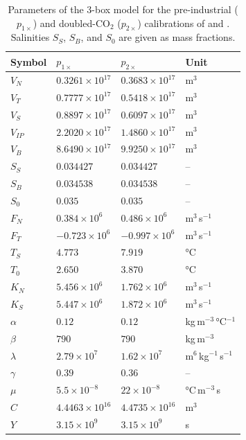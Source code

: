 \documentclass[12pt, a4paper]{article}
\newcommand{\CO}{CO\ensuremath{_2}}
\begin{document}
\begin{table}[t]
  \centering
  \small
  \caption{Parameters of the 3-box model for the pre-industrial ($p_{1\times}$) and doubled-\CO{} ($p_{2\times}$) calibrations of \citet{Wood20195BoxModel} and \citet{Alkhayuon2019AMOCRateTipping}. Salinities $S_S$, $S_B$, and $S_0$ are given as mass fractions.}
  \label{tab:box-params}
  \begin{tabular}{llll}
    \toprule
    Symbol & $p_{1\times}$ & $p_{2\times}$ & Unit \\
    \midrule
    $V_N$          & $0.3261\times10^{17}$ & $0.3683\times10^{17}$ & m$^3$ \\
    $V_T$          & $0.7777\times10^{17}$ & $0.5418\times10^{17}$ & m$^3$ \\
    $V_S$          & $0.8897\times10^{17}$ & $0.6097\times10^{17}$ & m$^3$ \\
    $V_{IP}$       & $2.2020\times10^{17}$ & $1.4860\times10^{17}$ & m$^3$ \\
    $V_B$          & $8.6490\times10^{17}$ & $9.9250\times10^{17}$ & m$^3$ \\
    $S_S$          & $0.034427$ & $0.034427$ & -- \\
    $S_B$          & $0.034538$ & $0.034538$ & -- \\
    $S_0$          & $0.035$ & $0.035$ & -- \\
    $F_N$          & $0.384\times10^{6}$ & $0.486\times10^{6}$ & m$^3$\,s$^{-1}$ \\
    $F_T$          & $-0.723\times10^{6}$ & $-0.997\times10^{6}$ & m$^3$\,s$^{-1}$ \\
    $T_S$          & $4.773$ & $7.919$ & °C \\
    $T_0$          & $2.650$ & $3.870$ & °C \\
    $K_N$          & $5.456\times10^{6}$ & $1.762\times10^{6}$ & m$^3$\,s$^{-1}$ \\
    $K_S$          & $5.447\times10^{6}$ & $1.872\times10^{6}$ & m$^3$\,s$^{-1}$ \\
    $\alpha$       & $0.12$ & $0.12$ & kg\,m$^{-3}$\,°C$^{-1}$ \\
    $\beta$        & $790$ & $790$ & kg\,m$^{-3}$ \\
    $\lambda$      & $2.79\times10^{7}$ & $1.62\times10^{7}$ & m$^6$\,kg$^{-1}$\,s$^{-1}$ \\
    $\gamma$       & $0.39$ & $0.36$ & -- \\
    $\mu$          & $5.5\times10^{-8}$ & $22\times10^{-8}$ & °C\,m$^{-3}$\,s \\
    $C$            & $4.4463\times10^{16}$ & $4.4735\times10^{16}$ & m$^3$ \\
    $Y$            & $3.15\times10^{9}$ & $3.15\times10^{9}$ & s \\
    \bottomrule
  \end{tabular}
\end{table}
\end{document}
